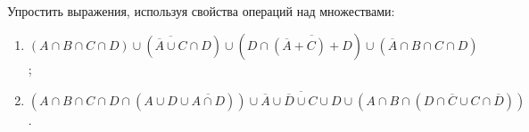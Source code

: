\question
Упростить выражения, используя свойства операций над множествами:

\begin{enumerate}
	\renewcommand{\labelenumi}{\alph{enumi})}
	\item $(A\cap B \cap C \cap D) \cup (\overline{\overline{A}\cup C}\cap D) \cup (D\cap\overline{(\overline{A}+C)+D})\cup (\overline{A}\cap B\cap C \cap D)$;
	\item $(A\cap B \cap C \cap D \cap (A\cup D \cup \overline{A\cap D}))\cup \overline{\overline{A}\cup \overline{D}\cup C\cup D}\cup (A\cap B \cap (D\cap\overline{C}\cup C\cap\overline{D}))$.
\end{enumerate}
